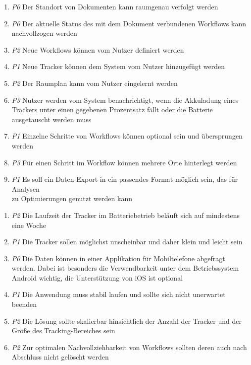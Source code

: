 \begin{enumerate}[label=\textbf{F-\arabic*}]
	\item \label{fa:tracking} \textit{P0} Der Standort von Dokumenten kann raumgenau verfolgt werden
	\item \label{fa:workflow} \textit{P0} Der aktuelle Status des mit dem Dokument verbundenen
		Workflows kann nachvollzogen werden
	\item \label{fa:neue-workflows} \textit{P2} Neue Workflows können vom Nutzer definiert werden
	\item \label{fa:neue-tracker} \textit{P1}  Neue Tracker können dem System vom Nutzer hinzugefügt werden
	\item \label{fa:raumplan} \textit{P2}  Der Raumplan kann vom Nutzer eingelernt werden
	\item \label{fa:benachrichtigung} \textit{P3} Nutzer werden vom System benachrichtigt, wenn die Akkuladung eines
	Trackers unter einen gegebenen Prozentsatz fällt oder die Batterie ausgetauscht werden muss
	\item \label{fa:optionale-schritte} \textit{P1} Einzelne Schritte von Workflows können optional sein und
	übersprungen werden
	\item \label{fa:mehrere-orte} \textit{P3}  Für einen Schritt im Workflow können mehrere Orte hinterlegt werden
	\item \label{fa:export} \textit{P1} Es soll ein Daten-Export in ein passendes Format möglich sein, das für Analysen \\
	  zu Optimierungen genutzt werden kann
\end{enumerate}


\begin{enumerate}[label=\textbf{NF-\arabic*}]
	\item \label{nf:akku} \textit{P2}  Die Laufzeit der Tracker im Batteriebetrieb beläuft sich auf mindestens eine Woche
	\item \label{nf:klein} \textit{P1}  Die Tracker sollen möglichst unscheinbar und daher klein und leicht sein
	\item \label{nf:app} \textit{P0}  Die Daten können in einer Applikation für Mobiltelefone abgefragt werden.  Dabei ist besonders die Verwendbarkeit unter dem Betriebssystem Android wichtig, die Unterstützung von iOS ist optional
	\item \label{nf:stabilität} \textit{P1}  Die Anwendung muss stabil laufen und sollte sich nicht unerwartet beenden
	\item \label{nf:skalierbarkeit} \textit{P2}  Die Lösung sollte skalierbar hinsichtlich der Anzahl der Tracker und der Größe des Tracking-Bereiches sein
	\item \label{nf:nachvollziehbarkeit} \textit{P2}  Zur optimalen Nachvollziehbarkeit von Workflows sollten deren auch nach Abschluss nicht gelöscht werden
\end{enumerate}

